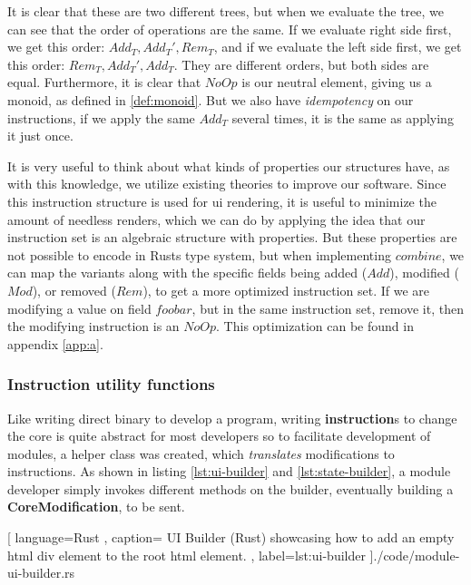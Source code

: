It is clear that these are two different trees, but when we evaluate the tree,
we can see that the order of operations are the same. If we evaluate right side
first, we get this order: $Add_T, Add_T', Rem_T$, and if we evaluate the left
side first, we get this order: $Rem_T, Add_T', Add_T$. They are different
orders, but both sides are equal. Furthermore, it is clear that $NoOp$ is our
neutral element, giving us a monoid, as defined in \ref{def:monoid}. But we
also have \textit{idempotency} on our instructions, if we apply the same $Add_T$
several times, it is the same as applying it just once.

It is very useful to think about what kinds of properties our structures have,
as with this knowledge, we utilize existing theories to improve our software.
Since this instruction structure is used for \gls*{ui} rendering, it is useful
to minimize the amount of needless renders, which we can do by applying the idea
that our instruction set is an algebraic structure with properties. But these
properties are not possible to encode in Rusts type system, but when
implementing $combine$, we can map the variants along with the specific fields
being added ($Add$), modified ($Mod$), or removed ($Rem$), to get a more
optimized instruction set. If we are modifying a value on field $foobar$, but in
the same instruction set, remove it, then the modifying instruction is an
$NoOp$. This optimization can be found in appendix \ref{app:a}.

\subsubsection{Instruction utility functions}

Like writing direct binary to develop a program, writing \textbf{instruction}s to
change the core is quite abstract for most developers so to facilitate development
of modules, a helper class was created, which \textit{translates} modifications
to instructions. As shown in listing \ref{lst:ui-builder} and
\ref{lst:state-builder}, a module developer simply invokes different methods on
the builder, eventually building a \textbf{CoreModification}, to be sent.

\begin{center}
  
   [ language=Rust
   , caption={
     UI Builder (Rust) showcasing how to add an empty \gls*{html} div element to
     the root \gls*{html} element.
   }
   , label=lst:ui-builder
   ]{./code/module-ui-builder.rs}
\end{center}

